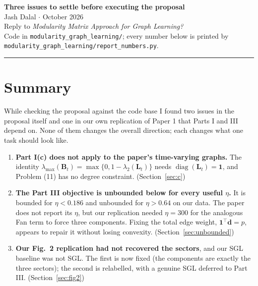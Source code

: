 \documentclass[11pt,a4paper]{article}
\newcommand{\Lap}{\mathbf{L}}
\newcommand{\Bmat}{\mathbf{B}}
\newcommand{\dvec}{\mathbf{d}}
\newcommand{\one}{\mathbf{1}}
\begin{document}
\begin{center}
{\Large\textbf{Three issues to settle before executing the proposal}}\\[2mm]
{\normalsize Jash Dalal \quad$\cdot$ October 2026}\\[1mm]
{\small Reply to \emph{Modularity Matrix Approach for Graph Learning?}\\
Code in \texttt{modularity\_graph\_learning/}; every number below is printed by
\texttt{modularity\_graph\_learning/report\_numbers.py}.}
\end{center}
\vspace{2mm}
\hrule
\vspace{4mm}

\section{Summary}

While checking the proposal against the code base I found two issues in the proposal
itself and one in our own replication of Paper 1 that Parts I and III depend on.
None of them changes the overall direction; each changes what one task should look
like.

\begin{enumerate}
\item \textbf{Part I(c) does not apply to the paper's time-varying graphs.} The
  identity $\lambda_{\max}(\Bmat_t)=\max\{0,1-\lambda_2(\Lap_t)\}$ needs
  $\operatorname{diag}(\Lap_t)=\one$, and Problem (11) has no degree constraint.
  (Section~\ref{sec:c})
\item \textbf{The Part III objective is unbounded below for every useful $\eta$.} It
  is bounded for $\eta<0.186$ and unbounded for $\eta>0.64$ on our data. The paper
  does not report its $\eta$, but our replication needed $\eta=300$ for the analogous
  Fan term to force three components. Fixing the total edge weight,
  $\one^\top\dvec=p$, appears to repair it without losing convexity.
  (Section~\ref{sec:unbounded})
\item \textbf{Our Fig.~2 replication had not recovered the sectors}, and our SGL
  baseline was not SGL. The first is now fixed (the components are exactly the three
  sectors); the second is relabelled, with a genuine SGL deferred to Part III.
  (Section~\ref{sec:fig2})
\end{enumerate}
\end{document}
